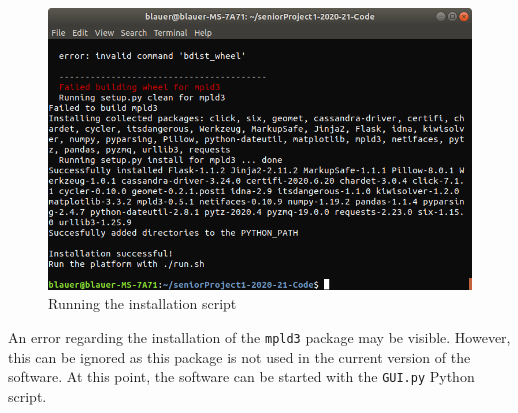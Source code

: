 \begin{figure}[H]
    \centering
    \includegraphics[scale=0.4]{figs/runinstall.png}
    \caption{Running the installation script}
    \label{fig:runinstall}
\end{figure}
An error regarding the installation of the \texttt{mpld3} package may be visible. However, this can be ignored as this package is not used in the current version of the software.
\medbreak\noindent
At this point, the software can be started with the \texttt{GUI.py} Python script.